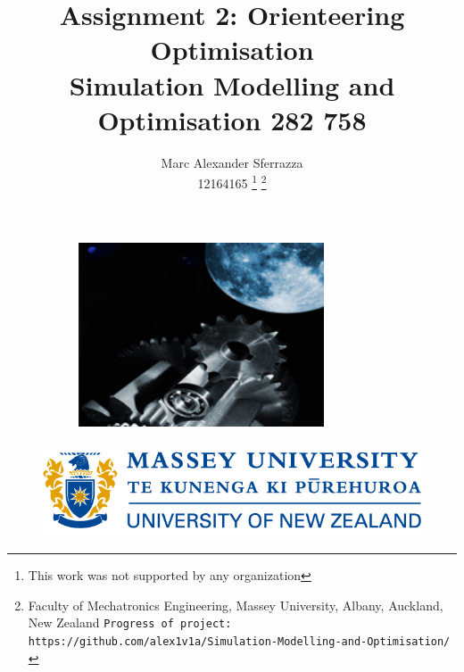 \documentclass[a4paper, 10pt]{IEEEconf}
\title{\LARGE \bf Assignment 2: Orienteering Optimisation\\Simulation Modelling and Optimisation 282 758}
\author{Marc Alexander Sferrazza \\ 12164165
\thanks{This work was not supported by any organization}
\thanks{Faculty of Mechatronics Engineering, Massey University, Albany, Auckland, New Zealand
        {\tt\small Progress of project: https://github.com/alex1v1a/Simulation-Modelling-and-Optimisation/} } }
\begin{document}
\maketitle
\begin{figure}[h]
\begin{subfigure}{\textwidth}
\includegraphics[width=0.8\textwidth, center]{images/mars} 
\label{fig:Gazebo}
\end{subfigure}
\end{figure}
\begin{figure}[H]
  \begin{center}
  \includegraphics[width=\textwidth]{images/masseyUniversity}
  \label{fig:kinetic}
  \end{center}
\end{figure}
\thispagestyle{empty}
\pagestyle{plain}




\end{document}
